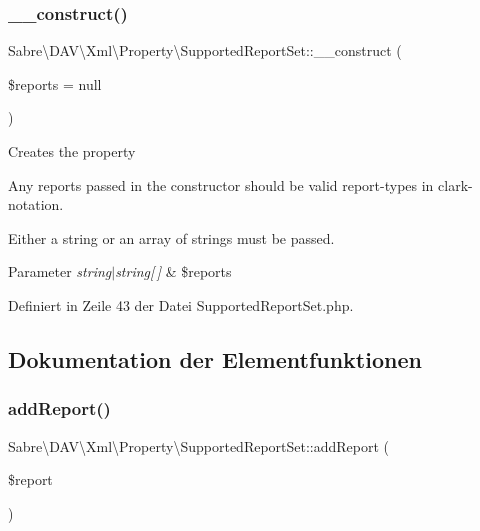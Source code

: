 \subsubsection{\texorpdfstring{\+\_\+\+\_\+construct()}{\_\_construct()}}
{\footnotesize\ttfamily Sabre\textbackslash{}\+D\+A\+V\textbackslash{}\+Xml\textbackslash{}\+Property\textbackslash{}\+Supported\+Report\+Set\+::\+\_\+\+\_\+construct (\begin{DoxyParamCaption}\item[{}]{\$reports = {\ttfamily null} }\end{DoxyParamCaption})}

Creates the property

Any reports passed in the constructor should be valid report-\/types in clark-\/notation.

Either a string or an array of strings must be passed.


\begin{DoxyParams}{Parameter}
{\em string$\vert$string\mbox{[}$\,$\mbox{]}} & \$reports \\
\hline
\end{DoxyParams}


Definiert in Zeile 43 der Datei Supported\+Report\+Set.\+php.



\subsection{Dokumentation der Elementfunktionen}
\mbox{\label{class_sabre_1_1_d_a_v_1_1_xml_1_1_property_1_1_supported_report_set_aaf8f8f745c03e09a211e16ce6e3f1176}} 
\subsubsection{\texorpdfstring{add\+Report()}{addReport()}}
{\footnotesize\ttfamily Sabre\textbackslash{}\+D\+A\+V\textbackslash{}\+Xml\textbackslash{}\+Property\textbackslash{}\+Supported\+Report\+Set\+::add\+Report (\begin{DoxyParamCaption}\item[{}]{\$report }\end{DoxyParamCaption})}

